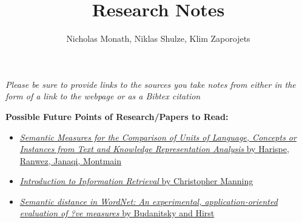 \documentclass[12pt]{article}
\newcommand{\bt}[1]{\textbf{#1}}
\begin{document}
\title{Research Notes}
\author{Nicholas Monath, Niklas Shulze, Klim Zaporojets}
\maketitle  

\begin{framed}
\emph{Please be sure to provide links to the sources you take notes from either in the form of a link to the webpage or as a Bibtex citation}
\end{framed}

\begin{framed}
\centering
\bt{Possible Future Points of Research/Papers to Read:}
\begin{itemize}
\item \href{http://arxiv.org/pdf/1310.1285v2.pdf}{\emph{Semantic Measures for the Comparison of Units of Language, Concepts or Instances from Text and Knowledge Representation Analysis} by Harispe, Ranwez, Janaqi, Montmain}
\item \href{http://www-nlp.stanford.edu/IR-book/}{\emph{Introduction to Information Retrieval} by Christopher Manning}
\item \href{ftp://learning.cs.utoronto.ca/pub/gh/Budanitsky+Hirst-2001.pdf}{\emph{Semantic distance in WordNet:
An experimental, application-oriented evaluation of ?ve measures} by Budanitsky and Hirst}
\end{itemize}
\end{framed}

\clearpage
\end{document}
